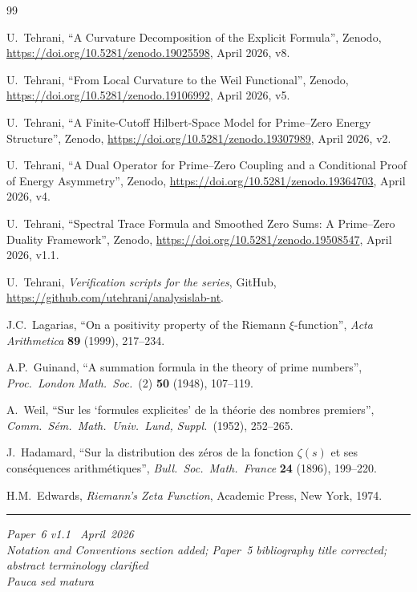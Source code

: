 \documentclass[11pt]{article}
\begin{document}
\begin{thebibliography}{99}

U.~Tehrani,
``A Curvature Decomposition of the Explicit Formula'',
Zenodo, \url{https://doi.org/10.5281/zenodo.19025598},
April 2026, v8.

U.~Tehrani,
``From Local Curvature to the Weil Functional'',
Zenodo, \url{https://doi.org/10.5281/zenodo.19106992},
April 2026, v5.

U.~Tehrani,
``A Finite-Cutoff Hilbert-Space Model
for Prime--Zero Energy Structure'',
Zenodo, \url{https://doi.org/10.5281/zenodo.19307989},
April 2026, v2.

U.~Tehrani,
``A Dual Operator for Prime--Zero Coupling
and a Conditional Proof of Energy Asymmetry'',
Zenodo, \url{https://doi.org/10.5281/zenodo.19364703},
April 2026, v4.

U.~Tehrani,
``Spectral Trace Formula and Smoothed Zero Sums:
A Prime--Zero Duality Framework'',
Zenodo, \url{https://doi.org/10.5281/zenodo.19508547},
April 2026, v1.1.

U.~Tehrani,
\emph{Verification scripts for the series},
GitHub, \url{https://github.com/utehrani/analysislab-nt}.

J.C.~Lagarias,
``On a positivity property of the Riemann $\xi$-function'',
\emph{Acta Arithmetica} \textbf{89} (1999), 217--234.

A.P.~Guinand,
``A summation formula in the theory of prime numbers'',
\emph{Proc.\ London Math.\ Soc.}\ (2) \textbf{50} (1948), 107--119.

A.~Weil,
``Sur les `formules explicites' de la th\'eorie des nombres
premiers'',
\emph{Comm.\ S\'em.\ Math.\ Univ.\ Lund, Suppl.}\ (1952), 252--265.

J.~Hadamard,
``Sur la distribution des z\'eros de la fonction $\zeta(s)$
et ses cons\'equences arithm\'etiques'',
\emph{Bull.\ Soc.\ Math.\ France} \textbf{24} (1896), 199--220.

H.M.~Edwards,
\emph{Riemann's Zeta Function},
Academic Press, New York, 1974.

\end{thebibliography}

\bigskip\noindent\rule{\linewidth}{0.4pt}\par\smallskip
\noindent\small
\emph{Paper~6 v1.1 \textperiodcentered\ April~2026}\\
\emph{Notation and Conventions section added; Paper~5 bibliography
title corrected; abstract terminology clarified}\\
\emph{Pauca sed matura}
\end{document}
